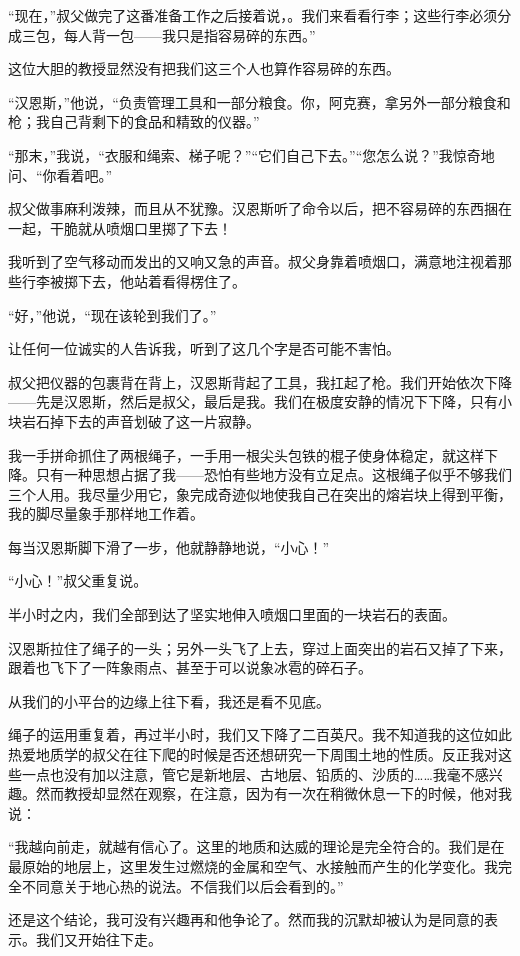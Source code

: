\documentclass[10pt]{book}
\begin{document}
“现在，”叔父做完了这番准备工作之后接着说，。我们来看看行李；这些行李必须分成三包，每人背一包——我只是指容易碎的东西。”

这位大胆的教授显然没有把我们这三个人也算作容易碎的东西。

“汉恩斯，”他说，“负责管理工具和一部分粮食。你，阿克赛，拿另外一部分粮食和枪；我自己背剩下的食品和精致的仪器。”

“那末，”我说，“衣服和绳索、梯子呢？”“它们自己下去。”“您怎么说？”我惊奇地问、“你看着吧。”

叔父做事麻利泼辣，而且从不犹豫。汉恩斯听了命令以后，把不容易碎的东西捆在一起，干脆就从喷烟口里掷了下去！

我听到了空气移动而发出的又响又急的声音。叔父身靠着喷烟口，满意地注视着那些行李被掷下去，他站着看得楞住了。

“好，”他说，“现在该轮到我们了。”

让任何一位诚实的人告诉我，听到了这几个字是否可能不害怕。

叔父把仪器的包裹背在背上，汉恩斯背起了工具，我扛起了枪。我们开始依次下降——先是汉恩斯，然后是叔父，最后是我。我们在极度安静的情况下下降，只有小块岩石掉下去的声音划破了这一片寂静。

我一手拼命抓住了两根绳子，一手用一根尖头包铁的棍子使身体稳定，就这样下降。只有一种思想占据了我——恐怕有些地方没有立足点。这根绳子似乎不够我们三个人用。我尽量少用它，象完成奇迹似地使我自己在突出的熔岩块上得到平衡，我的脚尽量象手那样地工作着。

每当汉恩斯脚下滑了一步，他就静静地说，“小心！”

“小心！”叔父重复说。

半小时之内，我们全部到达了坚实地伸入喷烟口里面的一块岩石的表面。

汉恩斯拉住了绳子的一头；另外一头飞了上去，穿过上面突出的岩石又掉了下来，跟着也飞下了一阵象雨点、甚至于可以说象冰雹的碎石子。

从我们的小平台的边缘上往下看，我还是看不见底。

绳子的运用重复着，再过半小时，我们又下降了二百英尺。我不知道我的这位如此热爱地质学的叔父在往下爬的时候是否还想研究一下周围土地的性质。反正我对这些一点也没有加以注意，管它是新地层、古地层、铅质的、沙质的……我毫不感兴趣。然而教授却显然在观察，在注意，因为有一次在稍微休息一下的时候，他对我说：

“我越向前走，就越有信心了。这里的地质和达威的理论是完全符合的。我们是在最原始的地层上，这里发生过燃烧的金属和空气、水接触而产生的化学变化。我完全不同意关于地心热的说法。不信我们以后会看到的。”

还是这个结论，我可没有兴趣再和他争论了。然而我的沉默却被认为是同意的表示。我们又开始往下走。
\end{document}
